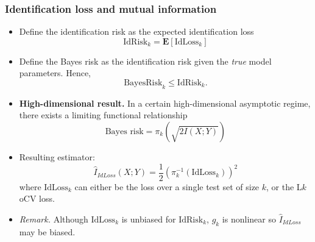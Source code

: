 \documentclass{beamer}
\newcommand{\E}{\textbf{E}}
\begin{document}
\begin{frame}
\frametitle{Identification loss and mutual information}
\begin{itemize}
\item Define the identification risk as the expected identification loss
\[
\text{IdRisk}_k = \E[\text{IdLoss}_k]
\]
\item Define the Bayes risk as the identification risk given the \emph{true} model parameters.
Hence,
\[
\text{BayesRisk}_k \leq \text{IdRisk}_k.
\]
\item \textbf{High-dimensional result.}  In a certain high-dimensional
  asymptotic regime, there exists a limiting functional relationship
\[
\text{Bayes risk} = \pi_k(\sqrt{2 I(X; Y)})
\]
\item Resulting estimator:
\[
\hat{I}_{IdLoss}(X; Y) = \frac{1}{2}(\pi_k^{-1}(\text{IdLoss}_k))^2
\]
where $\text{IdLoss}_k$ can either be the loss over a single test set of size $k$, or the L$k$oCV loss.
\item \emph{Remark.} Although $\text{IdLoss}_k$ is unbiased for $\text{IdRisk}_k$, $g_k$ is nonlinear so $\hat{I}_{IdLoss}$ may be biased.
\end{itemize}
\end{frame}
\end{document}
